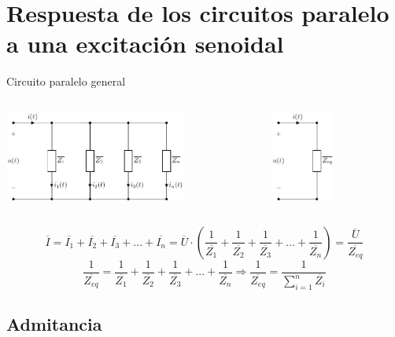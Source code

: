 \documentclass[aspectratio=169, xcolor={usenames,svgnames,dvipsnames}]{beamer}
\begin{document}
\section{Respuesta de los circuitos paralelo a una excitación senoidal}

\begin{frame}{Circuito paralelo general}
\begin{columns}
\begin{column}{0.7\linewidth}
\begin{center}
    \includegraphics[height=3cm]{../figs/paralelo_general.pdf}
\end{center}
\end{column}
\begin{column}{0.3\linewidth}
\begin{center}
    \includegraphics[height=3cm]{../figs/paralelo_general_eq.pdf}
\end{center}
\end{column}
\end{columns}

\begin{equation*}
		\overline{I}=\overline{I_1}+\overline{I_2}+\overline{I_3}+...+\overline{I_n}=\overline{U} \cdot\left(\dfrac{1}{\overline{Z_1}}+\dfrac{1}{\overline{Z_2}}+\dfrac{1}{\overline{Z_3}}+...+\dfrac{1}{\overline{Z_n}}\right)=\dfrac{\overline{U}}{\overline{Z_{eq}}}
	\end{equation*}
	\begin{equation*}
		\dfrac{1}{\overline{Z_{eq}}}=\dfrac{1}{\overline{Z_1}}+\dfrac{1}{\overline{Z_2}}+\dfrac{1}{\overline{Z_3}}+...+\dfrac{1}{\overline{Z_n}}\Rightarrow \boxed{\dfrac{1}{\overline{Z_{eq}}}=\dfrac{1}{\displaystyle\sum_{i=1}^n \overline{Z_i}}}
	\end{equation*}
\end{frame}

\subsection{Admitancia}
\end{document}
